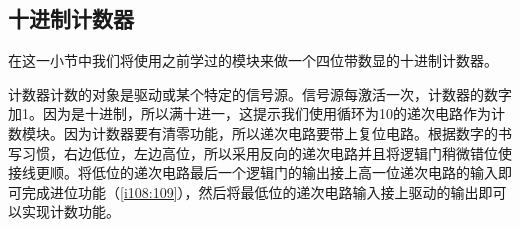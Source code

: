 \begin{figure}[!ht]
\begin{center}
\qquad
{}
\qquad
{}
\end{center}
\caption{}
\label{i92:97}
\end{figure}

\subsection{十进制计数器}

在这一小节中我们将使用之前学过的模块来做一个四位带数显的十进制计数器。

计数器计数的对象是驱动或某个特定的信号源。信号源每激活一次，计数器的数字加1。因为是十进制，所以满十进一，这提示我们使用循环为10的递次电路作为计数模块。因为计数器要有清零功能，所以递次电路要带上复位电路。根据数字的书写习惯，右边低位，左边高位，所以采用反向的递次电路并且将逻辑门稍微错位使接线更顺。将低位的递次电路最后一个逻辑门的输出接上高一位递次电路的输入即可完成进位功能（\autoref{i108:109}），然后将最低位的递次电路输入接上驱动的输出即可以实现计数功能。

